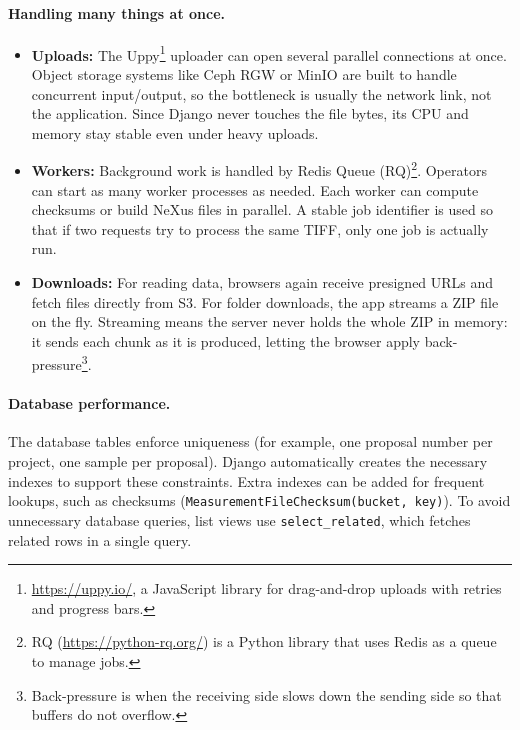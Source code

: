 \paragraph{Handling many things at once.}
\begin{itemize}
	\item \textbf{Uploads:} The Uppy\footnote{\url{https://uppy.io/}, a JavaScript library for drag-and-drop uploads with retries and progress bars.} uploader can open several parallel connections at once.  
	Object storage systems like Ceph RGW or MinIO are built to handle concurrent input/output, so the bottleneck is usually the network link, not the application.  
	Since Django never touches the file bytes, its CPU and memory stay stable even under heavy uploads.  
	
	\item \textbf{Workers:} Background work is handled by Redis Queue (RQ)\footnote{RQ (\url{https://python-rq.org/}) is a Python library that uses Redis as a queue to manage jobs.}.  
	Operators can start as many worker processes as needed.  
	Each worker can compute checksums or build NeXus files in parallel.  
	A stable job identifier is used so that if two requests try to process the same TIFF, only one job is actually run.  
	
	\item \textbf{Downloads:} For reading data, browsers again receive presigned URLs and fetch files directly from S3.  
	For folder downloads, the app streams a ZIP file on the fly.  
	Streaming means the server never holds the whole ZIP in memory: it sends each chunk as it is produced, letting the browser apply back-pressure\footnote{Back-pressure is when the receiving side slows down the sending side so that buffers do not overflow.}.
\end{itemize}

\paragraph{Database performance.}
The database tables enforce uniqueness (for example, one proposal number per project, one sample per proposal).  
Django automatically creates the necessary indexes to support these constraints.  
Extra indexes can be added for frequent lookups, such as checksums (\texttt{MeasurementFileChecksum(bucket, key)}).  
To avoid unnecessary database queries, list views use \texttt{select\_related}, which fetches related rows in a single query.

